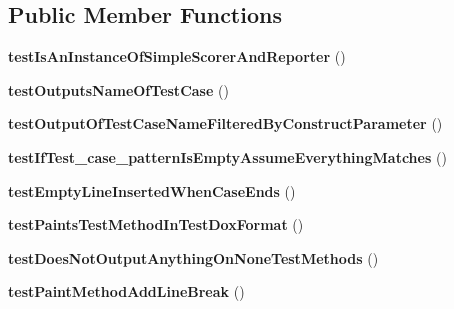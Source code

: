 \subsection*{Public Member Functions}
\begin{DoxyCompactItemize}
\item 
\hypertarget{class_test_of_test_dox_reporter_a8f47832e73e3af1b88b1e9e8170074f5}{
{\bfseries testIsAnInstanceOfSimpleScorerAndReporter} ()}
\label{class_test_of_test_dox_reporter_a8f47832e73e3af1b88b1e9e8170074f5}

\item 
\hypertarget{class_test_of_test_dox_reporter_a2dc0732b5ab19c643bdad09bc5f34920}{
{\bfseries testOutputsNameOfTestCase} ()}
\label{class_test_of_test_dox_reporter_a2dc0732b5ab19c643bdad09bc5f34920}

\item 
\hypertarget{class_test_of_test_dox_reporter_a5e974be695fe2217250767cdcdcaa6fb}{
{\bfseries testOutputOfTestCaseNameFilteredByConstructParameter} ()}
\label{class_test_of_test_dox_reporter_a5e974be695fe2217250767cdcdcaa6fb}

\item 
\hypertarget{class_test_of_test_dox_reporter_ab9b12c4388f8775504a466b6b491e6d1}{
{\bfseries testIfTest\_\-case\_\-patternIsEmptyAssumeEverythingMatches} ()}
\label{class_test_of_test_dox_reporter_ab9b12c4388f8775504a466b6b491e6d1}

\item 
\hypertarget{class_test_of_test_dox_reporter_ae30c51fd8fdc348cfbd4a486f6c2b129}{
{\bfseries testEmptyLineInsertedWhenCaseEnds} ()}
\label{class_test_of_test_dox_reporter_ae30c51fd8fdc348cfbd4a486f6c2b129}

\item 
\hypertarget{class_test_of_test_dox_reporter_aa52a9096757aa07cf5b2b9427776c95d}{
{\bfseries testPaintsTestMethodInTestDoxFormat} ()}
\label{class_test_of_test_dox_reporter_aa52a9096757aa07cf5b2b9427776c95d}

\item 
\hypertarget{class_test_of_test_dox_reporter_a533a082a3903e5b8ccd6112e6177aee3}{
{\bfseries testDoesNotOutputAnythingOnNoneTestMethods} ()}
\label{class_test_of_test_dox_reporter_a533a082a3903e5b8ccd6112e6177aee3}

\item 
\hypertarget{class_test_of_test_dox_reporter_a30f3fa8d354e8afd1329df28a351746b}{
{\bfseries testPaintMethodAddLineBreak} ()}
\label{class_test_of_test_dox_reporter_a30f3fa8d354e8afd1329df28a351746b}


\end{DoxyCompactItemize}
